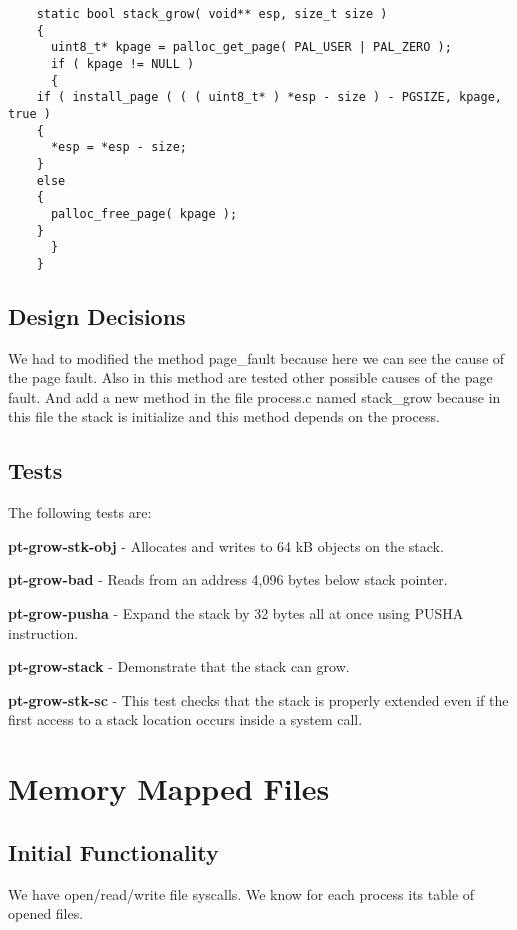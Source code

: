 \begin{lstlisting}
    static bool stack_grow( void** esp, size_t size )
    {
      uint8_t* kpage = palloc_get_page( PAL_USER | PAL_ZERO );
      if ( kpage != NULL )
      {
	if ( install_page ( ( ( uint8_t* ) *esp - size ) - PGSIZE, kpage, true )
	{
	  *esp = *esp - size;
	}
	else
	{
	  palloc_free_page( kpage );
	}
      }
    }
\end{lstlisting}


\subsection{Design Decisions}

We had to modified the method page\_fault because here we can see the cause of the page fault. Also in this method are tested other possible causes of the page fault. And add a new method in the file process.c named stack\_grow because in this file the stack is initialize and this method depends on the process.


\subsection{Tests}

The following tests are: 

\textbf{pt-grow-stk-obj} - Allocates and writes to 64 kB objects on the stack. 

\textbf{pt-grow-bad} - Reads from an address 4,096 bytes below stack pointer. 

\textbf{pt-grow-pusha} - Expand the stack by 32 bytes all at once using PUSHA instruction. 

\textbf{pt-grow-stack} - Demonstrate that the stack can grow. 

\textbf{pt-grow-stk-sc} - This test checks that the stack is properly extended even if the first access to a stack location occurs inside a system call. 



\section{Memory Mapped Files}
\subsection{Initial Functionality}

We have open/read/write file syscalls. We know for each process its table of opened files.


